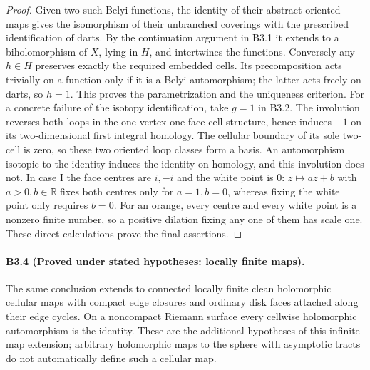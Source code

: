 \begin{proof}
Given two such Belyi functions, the identity of their abstract
oriented maps gives the isomorphism of their unbranched coverings
with the prescribed identification of darts. By the continuation
argument in B3.1 it extends to a biholomorphism of $X$, lying in
$H$, and intertwines the functions. Conversely any $h\in H$
preserves exactly the required embedded cells. Its precomposition
acts trivially on a function only if it is a Belyi automorphism;
the latter acts freely on darts, so $h=1$. This proves the
parametrization and the uniqueness criterion.
For a concrete failure of the isotopy identification, take $g=1$
in B3.2. The involution reverses both loops in the one-vertex
one-face cell structure, hence induces $-1$ on its two-dimensional
first integral homology. The cellular boundary of its sole two-cell
is zero, so these two oriented loop classes form a basis. An
automorphism isotopic to the identity induces the identity on
homology, and this involution does not.
In case I the face centres are $i,-i$ and the white point is $0$:
$z\mapsto az+b$ with $a>0,b\in\mathbb R$ fixes both centres
only for $a=1,b=0$, whereas fixing the white point only requires
$b=0$. For an orange, every centre and every white point is a
nonzero finite number, so a positive dilation fixing any one of
them has scale one. These direct calculations prove the final
assertions.
\end{proof}

\paragraph{B3.4 (Proved under stated hypotheses: locally finite maps).}
The same conclusion extends to connected locally finite clean
holomorphic cellular maps with compact edge closures and ordinary
disk faces attached along their edge cycles. On a noncompact
Riemann surface every cellwise holomorphic automorphism is the
identity. These are the additional hypotheses of this infinite-map
extension; arbitrary holomorphic maps to the sphere with asymptotic
tracts do not automatically define such a cellular map.

